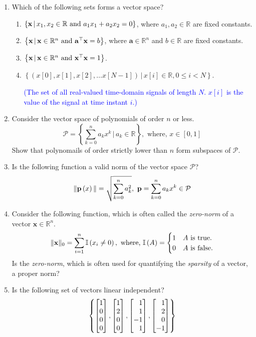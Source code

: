 \documentclass[
11pt, %
a4paper, %
oneside, %
headinclude,footinclude, %
BCOR5mm, %
]{scrartcl}
\def\mf{\ensuremath\mathbf}
\def\bmx{\ensuremath\begin{bmatrix*}[r]}
\def\emx{\ensuremath\end{bmatrix*}}
\begin{document}
\begin{enumerate}

\item Which of the following sets forms a vector space?
\begin{enumerate}
	\item $\left\{ \mf{x} \, \vert \, x_1, x_2 \in \mathbb{R} \text{ and } a_1x_1 + a_2 x_2 = 0 \right\}$, where $a_1, a_2 \in \mathbb{R}$ are fixed constants.
	\item $\left\{ \mf{x} \, \vert \, \mathbf{x} \in \mathbb{R}^n \text{ and } \mathbf{a}^\top \mathbf{x} = b \right\}$, where $\mathbf{a} \in \mathbb{R}^n$ and $b \in \mathbb{R}$ are fixed constants.
	\item $\left\{ \mf{x} \, \vert \, \mathbf{x} \in \mathbb{R}^n \text{ and } \mathbf{x}^\top \mathbf{x} = 1 \right\}$.
	\item $\left\{ \left(x[0], x[1], x[2], \ldots x[N-1]\right) \, \vert \, x[i] \in \mathbb{R}, 0 \leq i < N \right\}$.
	
	\textcolor{blue}{(\small{The set of all real-valued time-domain signals of length $N$. $x[i]$ is the value of the signal at time instant $i$.})}
\end{enumerate}

\item Consider the vector space of polynomials of order $n$ or less.
\[ \mathcal{P} = \left\{ \sum_{k=0}^n a_k x^k \, \bigg\vert \, a_k \in \mathbb{R} \right\}, \,\, \text{where, } x \in \left[0, 1\right] \]
Show that polynomails of order strictly lower than $n$ form subspaces of $\mathcal{P}$.

\item Is the following function a valid norm of the vector space $\mathcal{P}$?
\[ \Vert \mathbf{p}\left( x\right) \Vert = \sqrt{\sum_{k=0}^{n} a_k^2 }, \,\, \mathbf{p} = \sum_{k=0}^n a_kx^k \in \mathcal{P} \]

\item Consider the following function, which is often called the \textit{zero-norm} of a vector $\mathbf{x} \in \mathbb{R}^n$.
\[ \Vert \mathbf{x} \Vert_0 = \sum_{i=1}^n \mathbb{I}\left( x_i \neq 0\right), \,\, \text{where, } \mathbb{I}\left( A\right) = \begin{cases} 1 & A \text{ is true.} \\ 0 & A \text{ is false.}  \end{cases}  \] 
Is the \textit{zero-norm}, which is often used for quantifying the \textit{sparsity} of a vector, a proper norm?

\item Is the following set of vectors linear independent?
\[ \left\{ \bmx 1 \\ 0 \\ 0 \\ 0 \emx, \bmx 1 \\ 2 \\ 0 \\ 0 \emx , \bmx 1 \\ 1 \\ -1 \\ 1 \emx , \bmx 1 \\ 2 \\ 0 \\ -1 \emx  \right\} \]


\end{enumerate}
\end{document}
